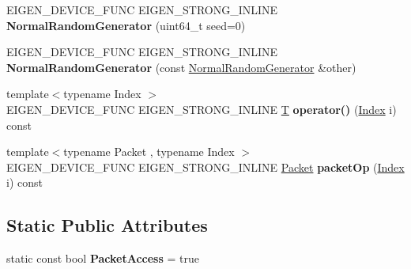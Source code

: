 \begin{DoxyCompactItemize}
\item 
\mbox{\label{class_eigen_1_1internal_1_1_normal_random_generator_a48f80fcfab1b8040a62d0e04ac684832}} 
E\+I\+G\+E\+N\+\_\+\+D\+E\+V\+I\+C\+E\+\_\+\+F\+U\+NC E\+I\+G\+E\+N\+\_\+\+S\+T\+R\+O\+N\+G\+\_\+\+I\+N\+L\+I\+NE {\bfseries Normal\+Random\+Generator} (uint64\+\_\+t seed=0)
\item 
\mbox{\label{class_eigen_1_1internal_1_1_normal_random_generator_a72f987949922e688ad90d874a0907b88}} 
E\+I\+G\+E\+N\+\_\+\+D\+E\+V\+I\+C\+E\+\_\+\+F\+U\+NC E\+I\+G\+E\+N\+\_\+\+S\+T\+R\+O\+N\+G\+\_\+\+I\+N\+L\+I\+NE {\bfseries Normal\+Random\+Generator} (const \hyperlink{class_eigen_1_1internal_1_1_normal_random_generator}{Normal\+Random\+Generator} \&other)
\item 
\mbox{\label{class_eigen_1_1internal_1_1_normal_random_generator_a8a82e8b1a9eb53b2ef7d8fd81c631c2d}} 
{\footnotesize template$<$typename Index $>$ }\\E\+I\+G\+E\+N\+\_\+\+D\+E\+V\+I\+C\+E\+\_\+\+F\+U\+NC E\+I\+G\+E\+N\+\_\+\+S\+T\+R\+O\+N\+G\+\_\+\+I\+N\+L\+I\+NE \hyperlink{group___sparse_core___module}{T} {\bfseries operator()} (\hyperlink{namespace_eigen_a62e77e0933482dafde8fe197d9a2cfde}{Index} i) const
\item 
\mbox{\label{class_eigen_1_1internal_1_1_normal_random_generator_a52364af996e11edf4fad190b1892b370}} 
{\footnotesize template$<$typename Packet , typename Index $>$ }\\E\+I\+G\+E\+N\+\_\+\+D\+E\+V\+I\+C\+E\+\_\+\+F\+U\+NC E\+I\+G\+E\+N\+\_\+\+S\+T\+R\+O\+N\+G\+\_\+\+I\+N\+L\+I\+NE \hyperlink{union_eigen_1_1internal_1_1_packet}{Packet} {\bfseries packet\+Op} (\hyperlink{namespace_eigen_a62e77e0933482dafde8fe197d9a2cfde}{Index} i) const
\end{DoxyCompactItemize}
\subsection*{Static Public Attributes}
\begin{DoxyCompactItemize}
\item 
\mbox{\label{class_eigen_1_1internal_1_1_normal_random_generator_a16c80d150aed45e2af300100b33c9831}} 
static const bool {\bfseries Packet\+Access} = true
\end{DoxyCompactItemize}


